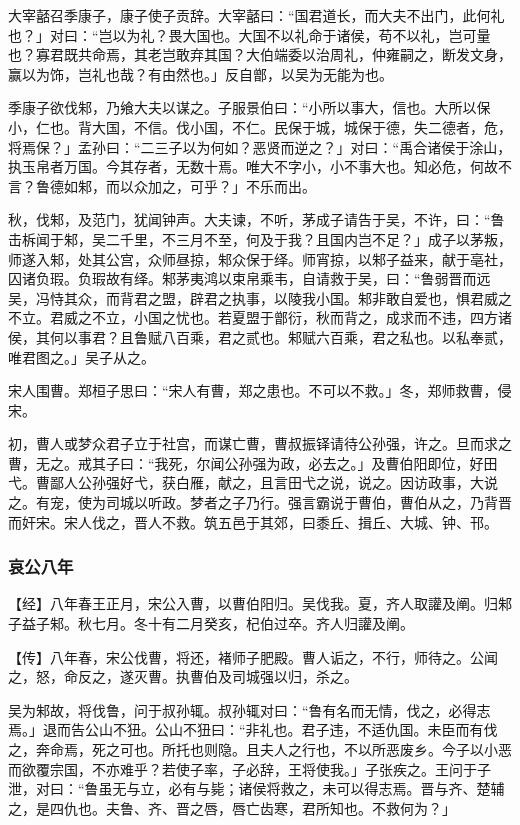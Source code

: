 \documentclass[]{article}
\begin{document}
大宰嚭召季康子，康子使子贡辞。大宰嚭曰：``国君道长，而大夫不出门，此何礼也？」对曰：``岂以为礼？畏大国也。大国不以礼命于诸侯，苟不以礼，岂可量也？寡君既共命焉，其老岂敢弃其国？大伯端委以治周礼，仲雍嗣之，断发文身，赢以为饰，岂礼也哉？有由然也。」反自鄫，以吴为无能为也。

季康子欲伐邾，乃飨大夫以谋之。子服景伯曰：``小所以事大，信也。大所以保小，仁也。背大国，不信。伐小国，不仁。民保于城，城保于德，失二德者，危，将焉保？」孟孙曰：``二三子以为何如？恶贤而逆之？」对曰：``禹合诸侯于涂山，执玉帛者万国。今其存者，无数十焉。唯大不字小，小不事大也。知必危，何故不言？鲁德如邾，而以众加之，可乎？」不乐而出。

秋，伐邾，及范门，犹闻钟声。大夫谏，不听，茅成子请告于吴，不许，曰：``鲁击柝闻于邾，吴二千里，不三月不至，何及于我？且国内岂不足？」成子以茅叛，师遂入邾，处其公宫，众师昼掠，邾众保于绎。师宵掠，以邾子益来，献于亳社，囚诸负瑕。负瑕故有绎。邾茅夷鸿以束帛乘韦，自请救于吴，曰：``鲁弱晋而远吴，冯恃其众，而背君之盟，辟君之执事，以陵我小国。邾非敢自爱也，惧君威之不立。君威之不立，小国之忧也。若夏盟于鄫衍，秋而背之，成求而不违，四方诸侯，其何以事君？且鲁赋八百乘，君之贰也。邾赋六百乘，君之私也。以私奉贰，唯君图之。」吴子从之。

宋人围曹。郑桓子思曰：``宋人有曹，郑之患也。不可以不救。」冬，郑师救曹，侵宋。

初，曹人或梦众君子立于社宫，而谋亡曹，曹叔振铎请待公孙强，许之。旦而求之曹，无之。戒其子曰：``我死，尔闻公孙强为政，必去之。」及曹伯阳即位，好田弋。曹鄙人公孙强好弋，获白雁，献之，且言田弋之说，说之。因访政事，大说之。有宠，使为司城以听政。梦者之子乃行。强言霸说于曹伯，曹伯从之，乃背晋而奸宋。宋人伐之，晋人不救。筑五邑于其郊，曰黍丘、揖丘、大城、钟、邗。

\hypertarget{header-n3121}{%
\subsubsection{哀公八年}\label{header-n3121}}

【经】八年春王正月，宋公入曹，以曹伯阳归。吴伐我。夏，齐人取讙及阐。归邾子益子邾。秋七月。冬十有二月癸亥，杞伯过卒。齐人归讙及阐。

【传】八年春，宋公伐曹，将还，褚师子肥殿。曹人诟之，不行，师待之。公闻之，怒，命反之，遂灭曹。执曹伯及司城强以归，杀之。

吴为邾故，将伐鲁，问于叔孙辄。叔孙辄对曰：``鲁有名而无情，伐之，必得志焉。」退而告公山不狃。公山不狃曰：``非礼也。君子违，不适仇国。未臣而有伐之，奔命焉，死之可也。所托也则隐。且夫人之行也，不以所恶废乡。今子以小恶而欲覆宗国，不亦难乎？若使子率，子必辞，王将使我。」子张疾之。王问于子泄，对曰：``鲁虽无与立，必有与毙；诸侯将救之，未可以得志焉。晋与齐、楚辅之，是四仇也。夫鲁、齐、晋之唇，唇亡齿寒，君所知也。不救何为？」
\end{document}
